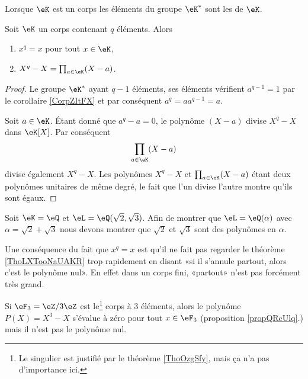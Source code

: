 Lorsque \( \eK\) est un corps les éléments du groupe \( \eK^*\) sont les  de \( \eK\).
\begin{proposition}     \label{propQRcUlq}
    Soit \( \eK\) un corps contenant \( q\) éléments. Alors
    \begin{enumerate}
        \item
            \( x^q=x\) pour tout \( x\in \eK\),
        \item
            \( X^q-X=\prod_{a\in \eK}(X-a)\).
    \end{enumerate}
\end{proposition}

\begin{proof}
    Le groupe \( \eK^*\) ayant \( q-1\) éléments, ses éléments vérifient \( a^{q-1}=1\) par le corollaire \ref{CorpZItFX} et par conséquent \( a^q=aa^{q-1}=a \).

    Soit \( a\in \eK\). Étant donné que \( a^q-a=0\), le polynôme \( (X-a)\) divise \( X^q-X\) dans \( \eK[X]\). Par conséquent 
    \begin{equation}
        \prod_{a\in \eK}(X-a)
    \end{equation}
    divise également \( X^q-X\). Les polynômes \( X^q-X\) et \( \prod_{a\in \eK}(X-a)\) étant deux polynômes unitaires de même degré, le fait que l'un divise l'autre montre qu'ils sont égaux.
\end{proof}

\begin{example}
    Soit \( \eK=\eQ\) et \( \eL=\eQ(\sqrt{2},\sqrt{3})\). Afin de montrer que \( \eL=\eQ(\alpha)\) avec \( \alpha=\sqrt{2}+\sqrt{3}\) nous devons montrer que \( \sqrt{2}\) et \( \sqrt{3}\) sont des polynômes en \( \alpha\).
\end{example}

Une conséquence du fait que \( x^q=x\) est qu'il ne fait pas regarder le théorème \ref{ThoLXTooNaUAKR} trop rapidement en disant «si il s'annule partout, alors c'est le polynôme nul». En effet dans un corps fini, «partout» n'est pas forcément très grand.

\begin{example}\label{exVQBooBMPLkD}
    Si \( \eF_3=\eZ/3\eZ\) est le\footnote{Le singulier est justifié par le théorème \ref{ThoOzgSfy}, mais ça n'a pas d'importance ici.} corps à \( 3\)
    éléments, alors le polynôme \( P(X)=X^3-X\) s'évalue à zéro pour tout \( x\in \eF_3\) (proposition \ref{propQRcUlq}.) mais il n'est pas le polynôme nul.
\end{example}

